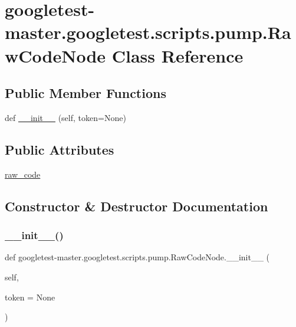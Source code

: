 \hypertarget{classgoogletest-master_1_1googletest_1_1scripts_1_1pump_1_1_raw_code_node}{}\section{googletest-\/master.googletest.\+scripts.\+pump.\+Raw\+Code\+Node Class Reference}
\label{classgoogletest-master_1_1googletest_1_1scripts_1_1pump_1_1_raw_code_node}
\subsection*{Public Member Functions}
\begin{DoxyCompactItemize}
\item 
def \mbox{\hyperlink{classgoogletest-master_1_1googletest_1_1scripts_1_1pump_1_1_raw_code_node_a834a5d9c1330fab9d2df69d0bdb4eb08}{\+\_\+\+\_\+init\+\_\+\+\_\+}} (self, token=None)
\end{DoxyCompactItemize}
\subsection*{Public Attributes}
\begin{DoxyCompactItemize}
\item 
\mbox{\hyperlink{classgoogletest-master_1_1googletest_1_1scripts_1_1pump_1_1_raw_code_node_a416a8c89b24886f21e0aea74f6074cb6}{raw\+\_\+code}}
\end{DoxyCompactItemize}


\subsection{Constructor \& Destructor Documentation}
\mbox{\label{classgoogletest-master_1_1googletest_1_1scripts_1_1pump_1_1_raw_code_node_a834a5d9c1330fab9d2df69d0bdb4eb08}} 
\subsubsection{\texorpdfstring{\_\_init\_\_()}{\_\_init\_\_()}}
{\footnotesize\ttfamily def googletest-\/master.\+googletest.\+scripts.\+pump.\+Raw\+Code\+Node.\+\_\+\+\_\+init\+\_\+\+\_\+ (\begin{DoxyParamCaption}\item[{}]{self,  }\item[{}]{token = {\ttfamily None} }\end{DoxyParamCaption})}




